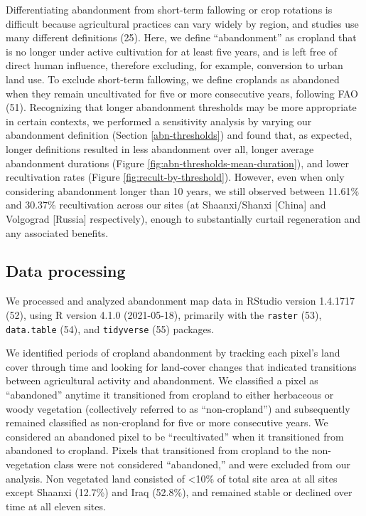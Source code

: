 \documentclass[9pt,twocolumn,twoside,]{pnas-new}
\begin{document}
Differentiating abandonment from short-term fallowing or crop rotations
is difficult because agricultural practices can vary widely by region,
and studies use many different definitions (25). Here, we define
``abandonment'' as cropland that is no longer under active cultivation
for at least five years, and is left free of direct human influence,
therefore excluding, for example, conversion to urban land use. To
exclude short-term fallowing, we define croplands as abandoned when they
remain uncultivated for five or more consecutive years, following FAO
(51). Recognizing that longer abandonment thresholds may be more
appropriate in certain contexts, we performed a sensitivity analysis by
varying our abandonment definition (Section \ref{abn-thresholds}) and
found that, as expected, longer definitions resulted in less abandonment
over all, longer average abandonment durations (Figure
\ref{fig:abn-thresholds-mean-duration}), and lower recultivation rates
(Figure \ref{fig:recult-by-threshold}). However, even when only
considering abandonment longer than 10 years, we still observed between
11.61\% and 30.37\% recultivation across our sites (at Shaanxi/Shanxi
{[}China{]} and Volgograd {[}Russia{]} respectively), enough to
substantially curtail regeneration and any associated benefits.

\hypertarget{data-processing}{%
\subsection{Data processing}\label{data-processing}}

We processed and analyzed abandonment map data in RStudio version
1.4.1717 (52), using R version 4.1.0 (2021-05-18), primarily with the
\texttt{raster} (53), \texttt{data.table} (54), and \texttt{tidyverse}
(55) packages.

We identified periods of cropland abandonment by tracking each pixel's
land cover through time and looking for land-cover changes that
indicated transitions between agricultural activity and abandonment. We
classified a pixel as ``abandoned'' anytime it transitioned from
cropland to either herbaceous or woody vegetation (collectively referred
to as ``non-cropland'') and subsequently remained classified as
non-cropland for five or more consecutive years. We considered an
abandoned pixel to be ``recultivated'' when it transitioned from
abandoned to cropland. Pixels that transitioned from cropland to the
non-vegetation class were not considered ``abandoned,'' and were
excluded from our analysis. Non vegetated land consisted of
\textless10\% of total site area at all sites except Shaanxi (12.7\%)
and Iraq (52.8\%), and remained stable or declined over time at all
eleven sites.
\end{document}
